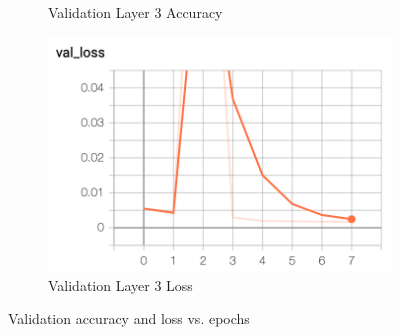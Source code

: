 \documentclass[11pt, letterpaper]{article}
\begin{document}
\begin{figure}[h]
\begin{subfigure}{0.4\textwidth}
        \caption{Validation Layer 3 Accuracy}
    \end{subfigure}
    \begin{subfigure}{0.4\textwidth}
        \centering
        \includegraphics[width=0.8\linewidth]{val_layer_3_loss.png}
        \caption{Validation Layer 3 Loss}
    \end{subfigure}
    \caption{Validation accuracy and loss vs. epochs}
    \label{fig:hg_4_val}
\end{figure}
\end{document}
